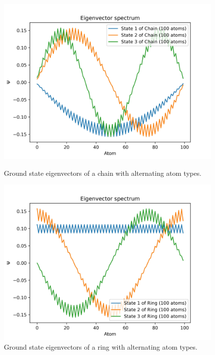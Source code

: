 \documentclass[twocolumn]{article}
\begin{document}
\begin{figure}[!h]
    \centering
    \begin{minipage}{0.47\textwidth}
        \centering
        \includegraphics[width=\textwidth]{Figures/chain_alpha_eigenvectors.jpg}
        \caption{Ground state eigenvectors of a chain with alternating atom types.}
        \label{fig:chain_alternating_alpha_vec}
    \end{minipage}
    \hfill
    \begin{minipage}{0.47\textwidth}
        \centering
        \includegraphics[width=\textwidth]{Figures/ring_alpha_eigenvectors.jpg}
        \caption{Ground state eigenvectors of a ring with alternating atom types.}
        \label{fig:ring_alternating_alpha_vec}
    \end{minipage}
\end{figure}
\end{document}
